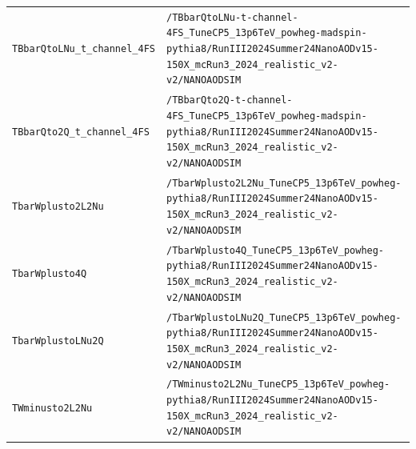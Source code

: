 \begin{longtable}{@{}>{\RaggedRight\arraybackslash}p{} >{\RaggedRight\arraybackslash}p{}@{}}
\addlinespace[2pt]
\texttt{TBbarQtoLNu\_\allowbreak{}t\_\allowbreak{}channel\_\allowbreak{}4FS} & \texttt{/\allowbreak{}TBbarQtoLNu-\allowbreak{}t-\allowbreak{}channel-\allowbreak{}4FS\_\allowbreak{}TuneCP5\_\allowbreak{}13p6TeV\_\allowbreak{}powheg-\allowbreak{}madspin-\allowbreak{}pythia8/\allowbreak{}RunIII2024Summer24NanoAODv15-\allowbreak{}150X\_\allowbreak{}mcRun3\_\allowbreak{}2024\_\allowbreak{}realistic\_\allowbreak{}v2-\allowbreak{}v2/\allowbreak{}NANOAODSIM} \\
\addlinespace[2pt]
\texttt{TBbarQto2Q\_\allowbreak{}t\_\allowbreak{}channel\_\allowbreak{}4FS} & \texttt{/\allowbreak{}TBbarQto2Q-\allowbreak{}t-\allowbreak{}channel-\allowbreak{}4FS\_\allowbreak{}TuneCP5\_\allowbreak{}13p6TeV\_\allowbreak{}powheg-\allowbreak{}madspin-\allowbreak{}pythia8/\allowbreak{}RunIII2024Summer24NanoAODv15-\allowbreak{}150X\_\allowbreak{}mcRun3\_\allowbreak{}2024\_\allowbreak{}realistic\_\allowbreak{}v2-\allowbreak{}v2/\allowbreak{}NANOAODSIM} \\
\addlinespace[2pt]
\texttt{TbarWplusto2L2Nu} & \texttt{/\allowbreak{}TbarWplusto2L2Nu\_\allowbreak{}TuneCP5\_\allowbreak{}13p6TeV\_\allowbreak{}powheg-\allowbreak{}pythia8/\allowbreak{}RunIII2024Summer24NanoAODv15-\allowbreak{}150X\_\allowbreak{}mcRun3\_\allowbreak{}2024\_\allowbreak{}realistic\_\allowbreak{}v2-\allowbreak{}v2/\allowbreak{}NANOAODSIM} \\
\addlinespace[2pt]
\texttt{TbarWplusto4Q} & \texttt{/\allowbreak{}TbarWplusto4Q\_\allowbreak{}TuneCP5\_\allowbreak{}13p6TeV\_\allowbreak{}powheg-\allowbreak{}pythia8/\allowbreak{}RunIII2024Summer24NanoAODv15-\allowbreak{}150X\_\allowbreak{}mcRun3\_\allowbreak{}2024\_\allowbreak{}realistic\_\allowbreak{}v2-\allowbreak{}v2/\allowbreak{}NANOAODSIM} \\
\addlinespace[2pt]
\texttt{TbarWplustoLNu2Q} & \texttt{/\allowbreak{}TbarWplustoLNu2Q\_\allowbreak{}TuneCP5\_\allowbreak{}13p6TeV\_\allowbreak{}powheg-\allowbreak{}pythia8/\allowbreak{}RunIII2024Summer24NanoAODv15-\allowbreak{}150X\_\allowbreak{}mcRun3\_\allowbreak{}2024\_\allowbreak{}realistic\_\allowbreak{}v2-\allowbreak{}v2/\allowbreak{}NANOAODSIM} \\
\addlinespace[2pt]
\texttt{TWminusto2L2Nu} & \texttt{/\allowbreak{}TWminusto2L2Nu\_\allowbreak{}TuneCP5\_\allowbreak{}13p6TeV\_\allowbreak{}powheg-\allowbreak{}pythia8/\allowbreak{}RunIII2024Summer24NanoAODv15-\allowbreak{}150X\_\allowbreak{}mcRun3\_\allowbreak{}2024\_\allowbreak{}realistic\_\allowbreak{}v2-\allowbreak{}v2/\allowbreak{}NANOAODSIM} \\

\end{longtable}
